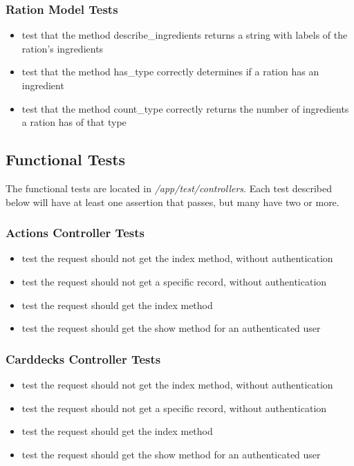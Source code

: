 \subsubsection{Ration Model Tests}
\begin{itemize}
	\item test that the method describe\_ingredients returns a string with labels of the ration's ingredients
	\item test that the method has\_type correctly determines if a ration has an ingredient
	\item test that the method count\_type correctly returns the number of ingredients a ration has of that type
\end{itemize}
	
  \subsection{Functional Tests}
The functional tests are located in \textit{/app/test/controllers}. Each test described below will have at least one assertion that passes, but many have two or more.
\subsubsection{Actions Controller Tests}
\begin{itemize}
	\item test the request should not get the index method, without authentication
	\item test the request should not get a specific record, without authentication
	\item test the request should get the index method
	\item test the request should get the show method for an authenticated user
\end{itemize}

\subsubsection{Carddecks Controller Tests}
\begin{itemize}
	\item test the request should not get the index method, without authentication
	\item test the request should not get a specific record, without authentication
	\item test the request should get the index method
	\item test the request should get the show method for an authenticated user
\end{itemize}

